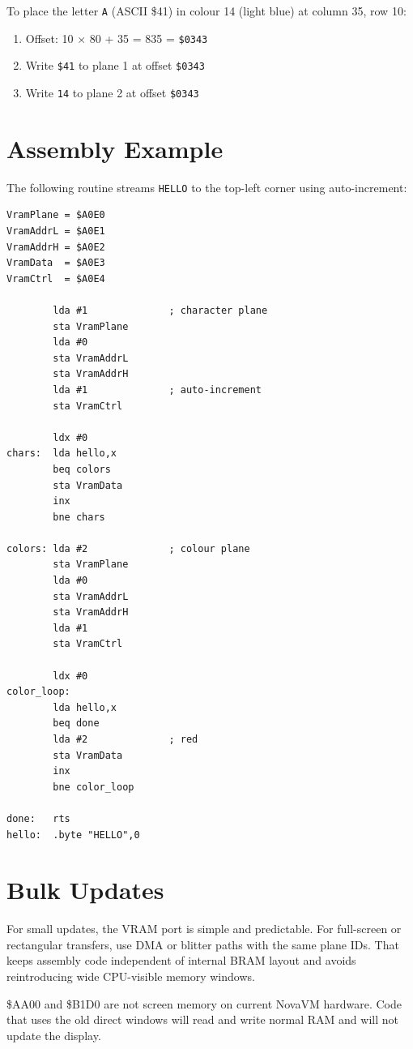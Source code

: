 To place the letter \texttt{A} (ASCII \$41) in colour 14 (light blue) at
column 35, row 10:

\begin{enumerate}
  \item Offset: 10 $\times$ 80 + 35 = 835 = \texttt{\$0343}
  \item Write \texttt{\$41} to plane 1 at offset \texttt{\$0343}
  \item Write \texttt{14} to plane 2 at offset \texttt{\$0343}
\end{enumerate}

\section{Assembly Example}

The following routine streams \texttt{HELLO} to the top-left corner using
auto-increment:

\begin{lstlisting}
VramPlane = $A0E0
VramAddrL = $A0E1
VramAddrH = $A0E2
VramData  = $A0E3
VramCtrl  = $A0E4

        lda #1              ; character plane
        sta VramPlane
        lda #0
        sta VramAddrL
        sta VramAddrH
        lda #1              ; auto-increment
        sta VramCtrl

        ldx #0
chars:  lda hello,x
        beq colors
        sta VramData
        inx
        bne chars

colors: lda #2              ; colour plane
        sta VramPlane
        lda #0
        sta VramAddrL
        sta VramAddrH
        lda #1
        sta VramCtrl

        ldx #0
color_loop:
        lda hello,x
        beq done
        lda #2              ; red
        sta VramData
        inx
        bne color_loop

done:   rts
hello:  .byte "HELLO",0
\end{lstlisting}

\section{Bulk Updates}

For small updates, the VRAM port is simple and predictable. For full-screen
or rectangular transfers, use DMA or blitter paths with the same plane IDs.
That keeps assembly code independent of internal BRAM layout and avoids
reintroducing wide CPU-visible memory windows.

\begin{warningbox}
\$AA00 and \$B1D0 are not screen memory on current NovaVM hardware. Code that
uses the old direct windows will read and write normal RAM and will not update
the display.
\end{warningbox}
